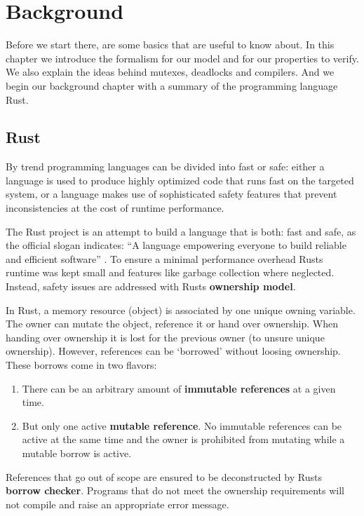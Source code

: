 \chapter{Background}
Before we start there, are some basics that are useful to know about.
In this chapter we introduce the formalism for our model and for our properties to verify.
We also explain the ideas behind mutexes, deadlocks and compilers.
And we begin our background chapter with a summary of the programming language Rust.

\section{Rust}
\label{rel_rust}
By trend programming languages can be divided into fast or safe\cite{speedSafety}: 
either a language is used to produce highly optimized code that runs fast on the targeted system,
or a language makes use of sophisticated safety features that prevent inconsistencies at the cost of runtime performance.

The Rust project is an attempt to build a language that is both: fast and safe, 
as the official slogan indicates: ``A language empowering everyone
to build reliable and efficient software'' \cite{rustSite}.
To ensure a minimal performance overhead Rusts runtime was kept small\cite[Chapter 16.1]{klabnik2018rust} and features like garbage collection where neglected\cite[Chapter 4]{klabnik2018rust}.
Instead, safety issues are addressed with Rusts \textbf{ownership model}\cite{Matsakis:2014:RL:2692956.2663188}.

In Rust, a memory resource (object) is associated by one unique owning variable.
The owner can mutate the object, reference it or hand over ownership.
When handing over ownership it is lost for the previous owner (to unsure unique ownership).
However, references can be `borrowed' without loosing ownership.
These borrows come in two flavors:
\begin{enumerate}
  \item There can be an arbitrary amount of \textbf{immutable references} at a given time.
  \item But only one active \textbf{mutable reference}. 
  No immutable references can be active at the same time and the owner is prohibited from mutating while a mutable borrow is active.
\end{enumerate}
References that go out of scope are ensured to be deconstructed by Rusts \textbf{borrow checker}. 
Programs that do not meet the ownership requirements will not compile and raise an appropriate error message.

